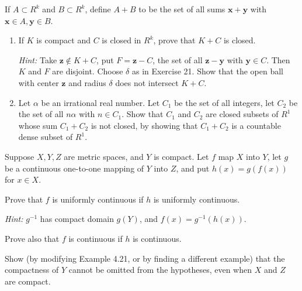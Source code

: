   \begin{exercise}[Rudin 4.25]
    If $A \subset R^k$ and $B \subset R^k$, define $A + B$ to be the set of all sums $\mathbf{x} + \mathbf{y}$ with $\mathbf{x} \in A, \mathbf{y} \in B$.
    \begin{enumerate}
      \item[(a)] If $K$ is compact and $C$ is closed in $R^k$, prove that $K + C$ is closed.
        \par \textit{Hint:} Take $\mathbf{z} \notin K + C$, put $F = \mathbf{z} - C$, the set of all $\mathbf{z} - \mathbf{y}$ with $\mathbf{y} \in C$. Then $K$ and $F$ are disjoint. Choose $\delta$ as in Exercise 21. Show that the open ball with center $\mathbf{z}$ and radius $\delta$ does not intersect $K + C$.
      \item[(b)] Let $\alpha$ be an irrational real number. Let $C_1$ be the set of all integers, let $C_2$ be the set of all $n\alpha$ with $n \in C_1$. Show that $C_1$ and $C_2$ are closed subsets of $R^1$ whose sum $C_1 + C_2$ is not closed, by showing that $C_1 + C_2$ is a countable dense subset of $R^1$.
    \end{enumerate}
  \end{exercise}
  \begin{solution}

  \end{solution}

  \begin{exercise}[Rudin 4.26]
    Suppose $X, Y, Z$ are metric spaces, and $Y$ is compact. Let $f$ map $X$ into $Y$, let $g$ be a continuous one-to-one mapping of $Y$ into $Z$, and put $h(x) = g(f(x))$ for $x \in X$.
    \par Prove that $f$ is uniformly continuous if $h$ is uniformly continuous.
    \par \textit{Hint:} $g^{-1}$ has compact domain $g(Y)$, and $f(x) = g^{-1}(h(x))$.
    \par Prove also that $f$ is continuous if $h$ is continuous.
    \par Show (by modifying Example 4.21, or by finding a different example) that the compactness of $Y$ cannot be omitted from the hypotheses, even when $X$ and $Z$ are compact.
  \end{exercise}
  \begin{solution}

  \end{solution}
  
